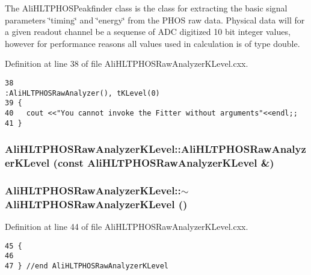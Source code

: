 The Ali\-HLTPHOSPeakfinder class is the class for extracting the basic signal parameters \char`\"{}timing\char`\"{} and \char`\"{}energy\char`\"{} from the PHOS raw data. Physical data will for a given readout channel be a sequense of ADC digitized 10 bit integer values, however for performance reasons all values used in calculation is of type double. 

Definition at line 38 of file Ali\-HLTPHOSRaw\-Analyzer\-KLevel.cxx.

\footnotesize\begin{verbatim}38                                                         :AliHLTPHOSRawAnalyzer(), tKLevel(0) 
39 {
40   cout <<"You cannot invoke the Fitter without arguments"<<endl;;
41 }
\end{verbatim}\normalsize 


\subsubsection{\setlength{\rightskip}{0pt plus 5cm}Ali\-HLTPHOSRaw\-Analyzer\-KLevel::Ali\-HLTPHOSRaw\-Analyzer\-KLevel (const {\bf Ali\-HLTPHOSRaw\-Analyzer\-KLevel} \&)}\label{classAliHLTPHOSRawAnalyzerKLevel_a1}


\subsubsection{\setlength{\rightskip}{0pt plus 5cm}Ali\-HLTPHOSRaw\-Analyzer\-KLevel::$\sim${\bf Ali\-HLTPHOSRaw\-Analyzer\-KLevel} ()\hspace{0.3cm}{\tt  [virtual]}}\label{classAliHLTPHOSRawAnalyzerKLevel_a3}




Definition at line 44 of file Ali\-HLTPHOSRaw\-Analyzer\-KLevel.cxx.

\footnotesize\begin{verbatim}45 {
46 
47 } //end AliHLTPHOSRawAnalyzerKLevel
\end{verbatim}\normalsize 




